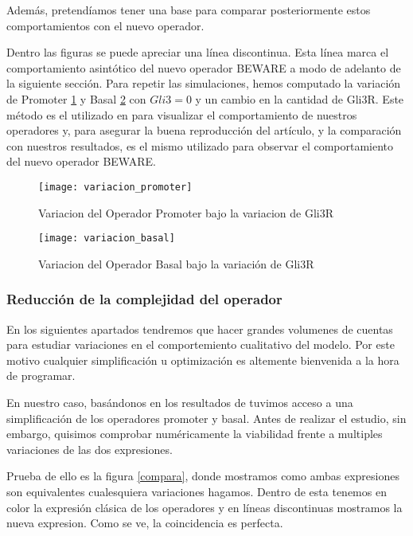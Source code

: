 Además, pretendíamos tener una base para comparar posteriormente estos comportamientos con el nuevo operador.

Dentro las figuras se puede apreciar una línea discontinua. Esta línea marca el comportamiento asintótico del nuevo operador BEWARE a modo de adelanto de la siguiente sección. 
Para repetir las simulaciones, hemos computado la variación de Promoter \ref{varipro} y Basal \ref{varibas} con $Gli3=0$ y un cambio en la cantidad de Gli3R. Este método es el utilizado en \cite{schaffer} para visualizar el comportamiento de nuestros operadores y, para asegurar la buena reproducción del artículo, y la comparación con nuestros resultados, es el mismo utilizado para observar el comportamiento del nuevo operador BEWARE.

 \begin{figure}[h]
 	\texttt{[image: variacion\_promoter]}
 	\centering
 	\caption{Variacion del Operador Promoter bajo la variacion de Gli3R }
 	\label{varipro}
 \end{figure}

\begin{figure}[h]
	\texttt{[image: variacion\_basal]}
	\centering
	\caption{Variacion del Operador Basal bajo la variación de Gli3R }
	\label{varibas}
\end{figure}

\subsubsection{Reducción de la complejidad del operador}

En los siguientes apartados tendremos que hacer grandes volumenes de cuentas para estudiar variaciones en el comportemiento cualitativo del modelo. Por este motivo cualquier simplificación u optimización es altemente bienvenida a la hora de programar. 

En nuestro caso, basándonos en los resultados de \cite{multiple} tuvimos acceso a una simplificación de los operadores promoter y basal. Antes de realizar el estudio, sin embargo, quisimos comprobar numéricamente la viabilidad frente a multiples variaciones de las dos expresiones. 

Prueba de ello es la figura \ref{compara}, donde mostramos como ambas expresiones son equivalentes cualesquiera variaciones hagamos. Dentro de esta tenemos en color la expresión clásica de los operadores y en líneas discontinuas mostramos la nueva expresion. Como se ve, la coincidencia es perfecta. 

